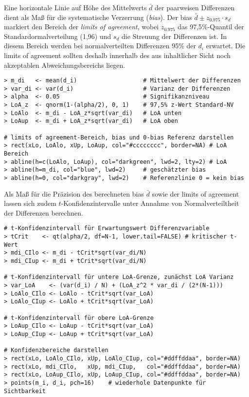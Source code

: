 Eine horizontale Linie auf Höhe des Mittelwerts $\bar{d}$ der paarweisen Differenzen dient als Maß für die systematische Verzerrung (\emph{bias}). Der bias $\bar{d} \pm z_{0.975} \cdot s_{d}$ markiert den Bereich der \emph{limits of agreement}, wobei $z_{0.975}$ das 97,5\%-Quantil der Standardormalverteilung (1,96) und $s_{d}$ die Streuung der Differenzen ist. In diesem Bereich werden bei normalverteilten Differenzen 95\% der $d_{i}$ erwartet. Die limits of agreement sollten deshalb innerhalb des aus inhaltlicher Sicht noch akzeptablen Abweichungsbereichs liegen.
\begin{lstlisting}
> m_di   <- mean(d_i)                   # Mittelwert der Differenzen
> var_di <- var(d_i)                    # Varianz der Differenzen
> alpha  <- 0.05                        # Signifikanzniveau
> LoA_z  <- qnorm(1-(alpha/2), 0, 1)    # 97,5% z-Wert Standard-NV
> LoAlo  <- m_di - LoA_z*sqrt(var_di)   # LoA unten
> LoAup  <- m_di + LoA_z*sqrt(var_di)   # LoA oben

# limits of agreement-Bereich, bias und 0-bias Referenz darstellen
> rect(xLo, LoAlo, xUp, LoAup, col="#cccccccc", border=NA) # LoA Bereich
> abline(h=c(LoAlo, LoAup), col="darkgreen", lwd=2, lty=2) # LoA
> abline(h=m_di, col="blue", lwd=2)     # geschätzter bias
> abline(h=0, col="darkgray", lwd=2)    # Referenzlinie 0 = kein bias
\end{lstlisting}

Als Maß für die Präzision des berechneten bias $\bar{d}$ sowie der limits of agreement lassen sich zudem $t$-Konfidenzintervalle unter Annahme von Normalverteiltheit der Differenzen berechnen.
\begin{lstlisting}
# t-Konfidenzintervall für Erwartungswert Differenzvariable
> tCrit    <- qt(alpha/2, df=N-1, lower.tail=FALSE) # kritischer t-Wert
> mdi_CIlo <- m_di - tCrit*sqrt(var_di/N)
> mdi_CIup <- m_di + tCrit*sqrt(var_di/N)

# t-Konfidenzintervall für untere LoA-Grenze, zunächst LoA Varianz
> var_LoA    <- (var(d_i) / N) + (LoA_z^2 * var_di / (2*(N-1)))
> LoAlo_CIlo <- LoAlo - tCrit*sqrt(var_LoA)
> LoAlo_CIup <- LoAlo + tCrit*sqrt(var_LoA)

# t-Konfidenzintervall für obere LoA-Grenze
> LoAup_CIlo <- LoAup - tCrit*sqrt(var_LoA)
> LoAup_CIup <- LoAup + tCrit*sqrt(var_LoA)

# Konfidenzbereiche darstellen
> rect(xLo, LoAlo_CIlo, xUp, LoAlo_CIup, col="#ddffddaa", border=NA)
> rect(xLo, mdi_CIlo,   xUp, mdi_CIup,   col="#ddffddaa", border=NA)
> rect(xLo, LoAup_CIlo, xUp, LoAup_CIup, col="#ddffddaa", border=NA)
> points(m_i, d_i, pch=16)    # wiederhole Datenpunkte für Sichtbarkeit
\end{lstlisting}

